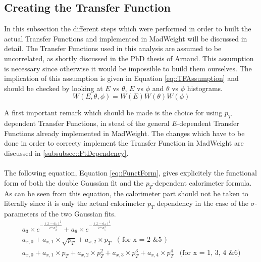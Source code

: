 \subsection{Creating the Transfer Function}
In this subsection the different steps which were performed in order to built the actual Transfer Functions and implemented in MadWeight will be discussed in detail. The Transfer Functions used in this analysis are assumed to be uncorrelated, as shortly discussed in the PhD thesis of Arnaud. This assumption is necessary since otherwise it would be impossible to build them ourselves. The implication of this assumption is given in Equation \ref{eq::TFAssumption} and should be checked by looking at $E$ vs $\theta$, $E$ vs $\phi$ and $\theta$ vs $\phi$ histograms.
\begin{equation} \label{eq::TFAssumption}
 W(E, \theta, \phi) = W(E) W(\theta) W(\phi)
\end{equation}

A first important remark which should be made is the choice for using $p_{T}$ dependent Transfer Functions, in stead of the general $E$-dependent Transfer Functions already implemented in MadWeight. The changes which have to be done in order to correcty implement the Transfer Function in MadWeight are discussed in \ref{subsubsec::PtDependency}.\\
\\
The following equation, Equation \ref{eq::FunctForm}, gives explicitely the functional form of both the double Gaussian fit and the $p_T$-dependent calorimeter formula. As can be seen from this equation, the calorimeter part should not be taken to literally since it is only the actual calorimeter $p_T$ dependency in the case of the $\sigma$-parameters of the two Gaussian fits.
\begin{eqnarray}
 a_3 \times e^{-\frac{(x-a_1)^2}{2*a_{2}^{2}}} + a_6 \times e^{-\frac{(x-a_4)^2}{2*a_{5}^{2}}} \nonumber \\
 a_{x,0} + a_{x,1} \times \sqrt{p_T} + a_{x,2} \times p_T \;\;\;  \textrm{( for x = 2 \& 5 )}\nonumber \\
 a_{x,0} + a_{x,1} \times p_T + a_{x,2} \times p_{T}^{2} + a_{x,3} \times p_{T}^{3} + a_{x,4} \times p_{T}^{4} \;\;\; \textrm{(for x = 1, 3, 4 \& 6)} \label{eq::FunctForm}
\end{eqnarray}

